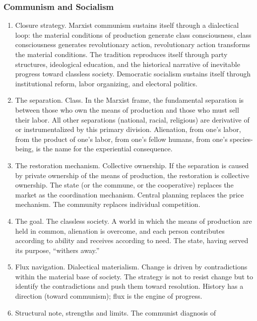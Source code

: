 \documentclass[
]{article}
\begin{document}
\subsubsection{Communism and Socialism}\label{communism-and-socialism}

\begin{enumerate}
\def\labelenumi{\arabic{enumi}.}
\setcounter{enumi}{88}
\item
  Closure strategy. Marxist communism sustains itself through a
  dialectical loop: the material conditions of production generate class
  consciousness, class consciousness generates revolutionary action,
  revolutionary action transforms the material conditions. The tradition
  reproduces itself through party structures, ideological education, and
  the historical narrative of inevitable progress toward classless
  society. Democratic socialism sustains itself through institutional
  reform, labor organizing, and electoral politics.
\item
  The separation. Class. In the Marxist frame, the fundamental
  separation is between those who own the means of production and those
  who must sell their labor. All other separations (national, racial,
  religious) are derivative of or instrumentalized by this primary
  division. Alienation, from one's labor, from the product of one's
  labor, from one's fellow humans, from one's species-being, is the name
  for the experiential consequence.
\item
  The restoration mechanism. Collective ownership. If the separation is
  caused by private ownership of the means of production, the
  restoration is collective ownership. The state (or the commune, or the
  cooperative) replaces the market as the coordination mechanism.
  Central planning replaces the price mechanism. The community replaces
  individual competition.
\item
  The goal. The classless society. A world in which the means of
  production are held in common, alienation is overcome, and each person
  contributes according to ability and receives according to need. The
  state, having served its purpose, ``withers away.''
\item
  Flux navigation. Dialectical materialism. Change is driven by
  contradictions within the material base of society. The strategy is
  not to resist change but to identify the contradictions and push them
  toward resolution. History has a direction (toward communism); flux is
  the engine of progress.
\item
  Structural note, strengths and limits. The communist diagnosis of

\end{enumerate}
\end{document}
